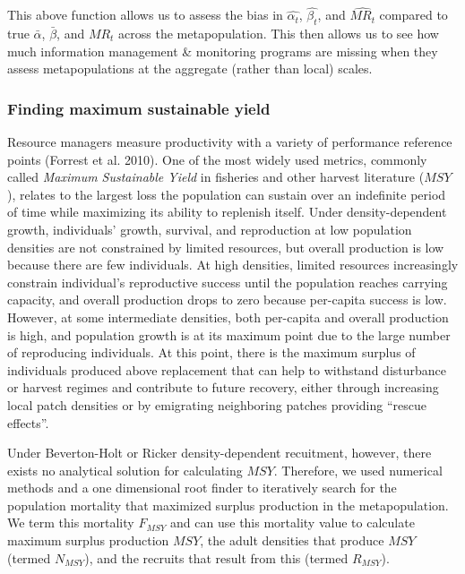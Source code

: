 \documentclass[
]{article}
\begin{document}
This above function allows us to assess the bias in \(\hat{\alpha_t}\),
\(\hat{\beta_t}\), and \(\hat{MR_t}\) compared to true \(\bar{\alpha}\),
\(\bar{\beta}\), and \({MR}_t\) across the metapopulation. This then
allows us to see how much information management \& monitoring programs
are missing when they assess metapopulations at the aggregate (rather
than local) scales.

\hypertarget{finding-maximum-sustainable-yield}{%
\subsubsection{Finding maximum sustainable
yield}\label{finding-maximum-sustainable-yield}}

Resource managers measure productivity with a variety of performance
reference points (Forrest et al. 2010). One of the most widely used
metrics, commonly called \emph{Maximum Sustainable Yield} in fisheries
and other harvest literature (\(MSY\)), relates to the largest loss the
population can sustain over an indefinite period of time while
maximizing its ability to replenish itself. Under density-dependent
growth, individuals' growth, survival, and reproduction at low
population densities are not constrained by limited resources, but
overall production is low because there are few individuals. At high
densities, limited resources increasingly constrain individual's
reproductive success until the population reaches carrying capacity, and
overall production drops to zero because per-capita success is low.
However, at some intermediate densities, both per-capita and overall
production is high, and population growth is at its maximum point due to
the large number of reproducing individuals. At this point, there is the
maximum surplus of individuals produced above replacement that can help
to withstand disturbance or harvest regimes and contribute to future
recovery, either through increasing local patch densities or by
emigrating neighboring patches providing ``rescue effects''.

Under Beverton-Holt or Ricker density-dependent recuitment, however,
there exists no analytical solution for calculating \(MSY\). Therefore,
we used numerical methods and a one dimensional root finder to
iteratively search for the population mortality that maximized surplus
production in the metapopulation. We term this mortality \(F_{MSY}\) and
can use this mortality value to calculate maximum surplus production
\(MSY\), the adult densities that produce \(MSY\) (termed \(N_{MSY}\)),
and the recruits that result from this (termed \(R_{MSY}\)).
\end{document}
